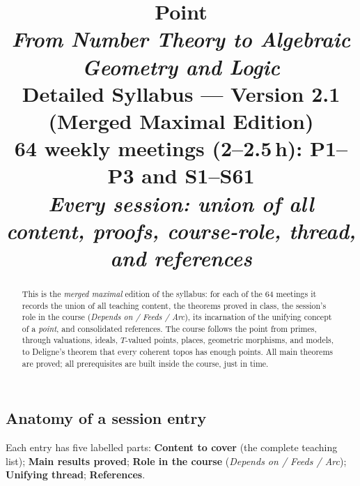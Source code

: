 \documentclass[11pt,a4paper]{article}
\title{
	{\color{navy}\textbf{\Huge Point}}\\[0.4em]
	\Large \textit{From Number Theory to Algebraic Geometry and Logic}\\[0.8em]
	\large \textbf{Detailed Syllabus --- Version 2.1 (Merged Maximal Edition)}\\[0.4em]
	\normalsize 64 weekly meetings (2--2.5\,h): P1--P3 and S1--S61\\
	\normalsize \emph{Every session: union of all content, proofs, course-role, thread, and references}
}
\author{}
\date{}
\begin{document}
	\maketitle
	\thispagestyle{empty}
	
	\begin{abstract}
		\noindent
		This is the \emph{merged maximal} edition of the syllabus: for each of the 64 meetings it records the union of all teaching content, the theorems proved in class, the session's role in the course (\emph{Depends on / Feeds / Arc}), its incarnation of the unifying concept of a \emph{point}, and consolidated references. The course follows the point from primes, through valuations, ideals, $T$-valued points, places, geometric morphisms, and models, to Deligne's theorem that every coherent topos has enough points. All main theorems are proved; all prerequisites are built inside the course, just in time.
	\end{abstract}
	
	\subsection*{Anatomy of a session entry}
	Each entry has five labelled parts: \textbf{Content to cover} (the complete teaching list); \textbf{Main results proved}; \textbf{Role in the course} (\emph{Depends on / Feeds / Arc}); \textbf{Unifying thread}; \textbf{References}.
	
	\tableofcontents
	\newpage
	
\end{document}
